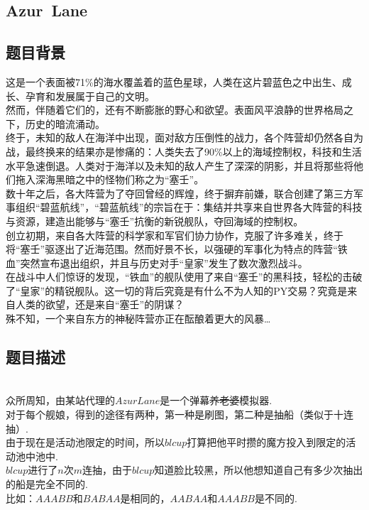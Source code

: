 \documentclass{article}
\begin{document}
\begin{spacing}{1.0}
\section{Azur\ Lane}
\subsection{题目背景}
这是一个表面被71\%的海水覆盖着的蓝色星球，人类在这片碧蓝色之中出生、成长、孕育和发展属于自己的文明。\\
然而，伴随着它们的，还有不断膨胀的野心和欲望。表面风平浪静的世界格局之下，历史的暗流涌动。\\
终于，未知的敌人在海洋中出现，面对敌方压倒性的战力，各个阵营却仍然各自为战，最终换来的结果亦是惨痛的：人类失去了90\%以上的海域控制权，科技和生活水平急速倒退。人类对于海洋以及未知的敌人产生了深深的阴影，并且将那些将他们拖入深海黑暗之中的怪物们称之为“塞壬”。\\
数十年之后，各大阵营为了夺回曾经的辉煌，终于摒弃前嫌，联合创建了第三方军事组织“碧蓝航线”，“碧蓝航线”的宗旨在于：集结并共享来自世界各大阵营的科技与资源，建造出能够与“塞壬”抗衡的新锐舰队，夺回海域的控制权。\\
创立初期，来自各大阵营的科学家和军官们协力协作，克服了许多难关，终于将“塞壬”驱逐出了近海范围。然而好景不长，以强硬的军事化为特点的阵营“铁血”突然宣布退出组织，并且与历史对手“皇家”发生了数次激烈战斗。\\
在战斗中人们惊讶的发现，“铁血”的舰队使用了来自“塞壬”的黑科技，轻松的击破了“皇家”的精锐舰队。这一切的背后究竟是有什么不为人知的PY交易？究竟是来自人类的欲望，还是来自“塞壬”的阴谋？\\
殊不知，一个来自东方的神秘阵营亦正在酝酿着更大的风暴…\\

\subsection{题目描述}
\\
众所周知，由某站代理的$Azur Lane$是一个弹幕\sout{养老婆}模拟器.\\
对于每个舰娘，得到的途径有两种，第一种是刷图，第二种是抽船（类似于十连抽）.\\
由于现在是活动池限定的时间，所以$blcup$打算把他平时攒的魔方投入到限定的活动池中池中.\\
$blcup$进行了$n$次$m$连抽，由于$blcup$知道脸比较黑，所以他想知道自己有多少次抽出的船是完全不同的.\\
比如：$AAABB$和$BABAA$是相同的，$AABAA$和$AAABB$是不同的.\\

\end{spacing}
\end{document}

